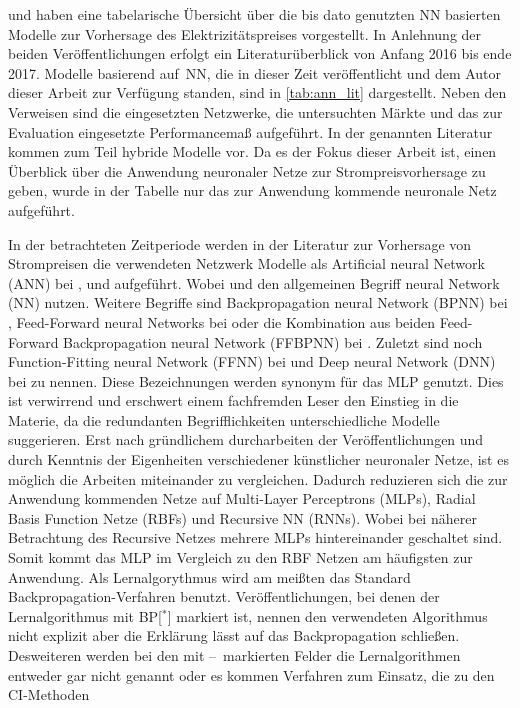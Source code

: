 \citet{Aggarwal2009} und \citet{Panapakidis2016} haben eine tabelarische Übersicht über die bis dato genutzten NN basierten Modelle zur Vorhersage des Elektrizitätspreises vorgestellt. In Anlehnung der beiden Veröffentlichungen erfolgt ein Literaturüberblick von Anfang 2016 bis ende 2017. 
Modelle basierend auf~NN, die in dieser Zeit veröffentlicht und dem Autor dieser Arbeit zur Verfügung standen, sind in \autoref{tab:ann_lit} dargestellt. Neben den Verweisen sind die eingesetzten Netzwerke, die untersuchten Märkte und das zur Evaluation eingesetzte Performancemaß aufgeführt. In der genannten Literatur kommen zum Teil hybride Modelle vor. Da es der Fokus dieser Arbeit ist, einen Überblick über die Anwendung neuronaler Netze zur Strompreisvorhersage zu geben, wurde in der Tabelle nur das zur Anwendung kommende neuronale Netz aufgeführt. 


In der betrachteten Zeitperiode werden in der Literatur zur Vorhersage von Strompreisen die verwendeten Netzwerk Modelle als Artificial neural Network (ANN) bei \citet{Mirakyan2017}, \citet{Gao2017} und \citet{Sandhu2016} aufgeführt. Wobei \citet{Davo2016} und \citet{Domanski2017} den allgemeinen Begriff neural Network (NN) nutzen. Weitere Begriffe sind Backpropagation neural Network (BPNN) bei \citet{Wang2017}, Feed-Forward neural Networks bei \citet{Keles2016} oder die Kombination aus beiden Feed-Forward Backpropagation neural Network (FFBPNN) bei \citet{Peter2016}. Zuletzt sind noch Function-Fitting neural Network (FFNN) bei \citet{Marcos2017} und Deep neural Network (DNN) bei \citet{Lago2018} zu nennen. Diese Bezeichnungen werden synonym für das MLP genutzt. Dies ist verwirrend und erschwert einem fachfremden Leser den Einstieg in die Materie, da die redundanten Begrifflichkeiten unterschiedliche Modelle suggerieren. Erst nach gründlichem durcharbeiten der Veröffentlichungen und durch Kenntnis der Eigenheiten verschiedener künstlicher neuronaler Netze, ist es möglich die Arbeiten miteinander zu vergleichen. Dadurch reduzieren sich die zur Anwendung kommenden Netze auf Multi-Layer Perceptrons (MLPs), Radial Basis Function Netze (RBFs) und Recursive NN (RNNs). Wobei bei näherer Betrachtung des Recursive Netzes mehrere MLPs hintereinander geschaltet sind. Somit kommt das MLP im Vergleich zu den RBF Netzen am häufigsten zur Anwendung. Als Lernalgorythmus wird am meißten das Standard Backpropagation-Verfahren benutzt. Veröffentlichungen, bei denen der Lernalgorithmus mit \gls{BP}[$^{*}$] markiert ist, nennen den verwendeten Algorithmus nicht explizit aber die Erklärung lässt auf das Backpropagation schließen. Desweiteren werden bei den mit \glqq --\grqq~markierten Felder die Lernalgorithmen entweder gar nicht genannt oder es kommen Verfahren zum Einsatz, die zu den CI-Methoden

